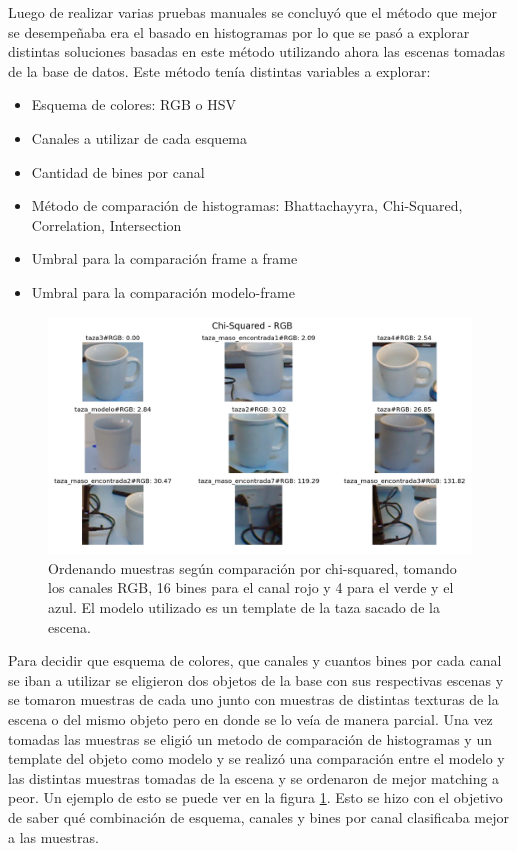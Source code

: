 Luego de realizar varias pruebas manuales se concluyó que el método que mejor se desempeñaba era el basado en histogramas por lo que se pasó a explorar distintas soluciones basadas en este método utilizando ahora las escenas tomadas de la base de datos. Este método tenía distintas variables a explorar:
\begin{itemize}
	\item Esquema de colores: RGB o HSV
	\item Canales a utilizar de cada esquema
	\item Cantidad de bines por canal
	\item Método de comparación de histogramas: Bhattachayyra, Chi-Squared, Correlation, Intersection
	\item Umbral para la comparación frame a frame
	\item Umbral para la comparación modelo-frame	
\end{itemize}


\begin{figure}
	\centering
	\includegraphics[width=\textwidth]{img/results_chi-squared_rgb_16r_4g_4b.png}
	\caption{Ordenando muestras según comparación por chi-squared, tomando los canales RGB, 16 bines para el canal rojo y 4 para el verde y el azul. El modelo utilizado es un template de la taza sacado de la escena.}
	\label{pruebas_eleccion_canales}
\end{figure}

Para decidir que esquema de colores, que canales y cuantos bines por cada canal se iban a utilizar se eligieron dos objetos de la base con sus respectivas escenas y se tomaron muestras de cada uno junto con muestras de distintas texturas de la escena o del mismo objeto pero en donde se lo veía de manera parcial. Una vez tomadas las muestras se eligió un metodo de comparación de histogramas y un template del objeto como modelo y se realizó una comparación entre el modelo y las distintas muestras tomadas de la escena y se ordenaron de mejor matching a peor. Un ejemplo de esto se puede ver en la figura \ref{pruebas_eleccion_canales}. Esto se hizo con el objetivo de saber qué combinación de esquema, canales y bines por canal clasificaba mejor a las muestras.

